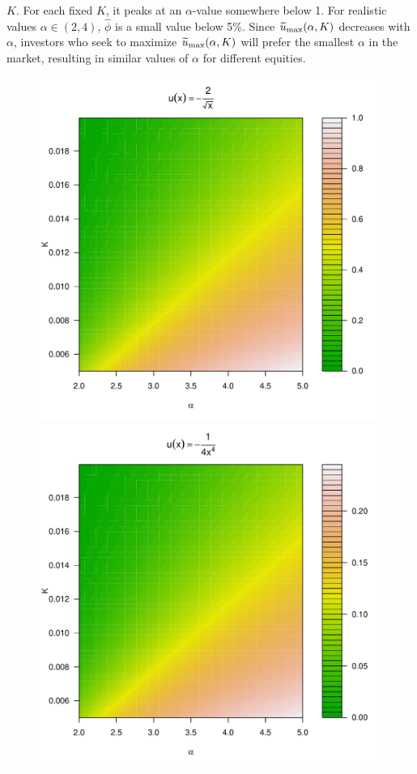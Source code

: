 \documentclass[11pt,a4]{amsart}
\newcommand{\wt}{\widetilde}
\newcommand{\1}{{\mathbf 1}}
\begin{document}
$K$. For each fixed $K$, it peaks at an $\alpha$-value somewhere below
1. For realistic values $\alpha\in (2, 4)$, $\hat\phi$ is a
small value below 5\%.
Since $\wt u_{\rm max}(\alpha, K)$ decreases with
$\alpha$, investors who seek to maximize $\wt u_{\rm max}(\alpha, K)$
will prefer the smallest $\alpha$ in the market, resulting in similar
values of $\alpha$ for different equities.
\begin{figure}[htb!]
  \begin{minipage}{0.25\linewidth}
    \includegraphics[width=\textwidth]{phi_hat_pareto5e-1_A.pdf}    
  \end{minipage}\hfill
  \begin{minipage}{0.25\linewidth}
    \includegraphics[width=\textwidth]{phi_hat_pareto4_A.pdf}

\end{minipage}
\end{figure}
\end{document}
